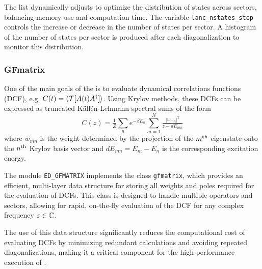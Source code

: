 \documentclass[edipack_sp.tex]{subfiles}
\begin{document}
The list dynamically adjusts to optimize the distribution of states 
across sectors, balancing memory use and computation time. The
variable \texttt{lanc\_nstates\_step} controls the increase or
decrease in the number of states per sector. 
A histogram  of the number of states per sector is produced after each diagonalization to monitor this distribution.



\subsubsection{GFmatrix}
One of the main goals of the \NAME is to evaluate dynamical correlations
functions (DCF), e.g. $C(t) = \langle {\cal T}[ A(t) A^\dagger ]\rangle$. Using Krylov methods,
these DCFs can be expressed as truncated K\"all\'en-Lehmann spectral sums of the form
$$
C(z) = \tfrac{1}{Z}\sum_n e^{-\beta E_n} \sum_{m=1}^{N} \tfrac{|w_{mn}|^2}{ z
  - dE_{mn}}
$$
where $w_{mn}$ is the weight determined by the projection of the
$m^{\rm th}$ eigenstate onto the $n^{\rm th}$ Krylov basis vector and
$dE_{mn}=E_m-E_n$ is the corresponding excitation energy.

The module {\tt ED\_GFMATRIX} implements the class {\tt gfmatrix}, 
which provides an efficient, multi-layer data structure for storing 
all weights and poles required for the evaluation of DCFs. This 
class is designed to handle multiple operators and sectors, allowing 
for rapid, on-the-fly evaluation of the DCF for any complex frequency 
$z\in\mathbb{C}$.

The use of this data structure significantly reduces the computational 
cost of evaluating DCFs by minimizing redundant calculations and 
avoiding repeated diagonalizations, making it a critical component 
for the high-performance execution of \NAME.
\end{document}
